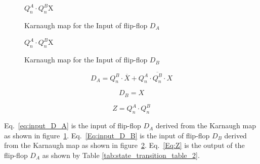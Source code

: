 


\begin{figure}[ht!]
    \centering
    \begin{Karnaughvuit}{$Q^A_n \cdot Q^B_n$}{X}
    \end{Karnaughvuit}
    \caption{Karnaugh map for the Input of flip-flop $D_A$}\label{fig:input_D_A}
\end{figure}\FloatBarrier



\begin{figure}[ht!]
\centering
\begin{Karnaughvuit}{$Q^A_n \cdot Q^B_n$}{X}
\end{Karnaughvuit}
\caption{Karnaugh map for the Input of flip-flop $D_B$}\label{fig:input_D_B}
\end{figure}\FloatBarrier

\begin{equation}\label{eq:input_D_A}
    D_A = {Q^B_n} \cdot \overline{X} + Q^A_n \cdot \overline{Q^B_n} \cdot X
\end{equation}

\begin{equation}\label{Eq:input_D_B}
    D_B = X
\end{equation}

\begin{equation}\label{Eq:Z}
    Z = Q^A_n \cdot Q^B_n
\end{equation}

Eq.~\ref{eq:input_D_A} is the input of flip-flop $D_A$ derived from the Karnaugh map as shown in figure~\ref{fig:input_D_A}. 
Eq.~\ref{Eq:input_D_B} is the input of flip-flop $D_B$ derived from the Karnaugh map as shown in figure~\ref{fig:input_D_B}.
Eq.~\ref{Eq:Z} is the output of the flip-flop $D_A$ as shown by Table \ref{tab:state_transition_table_2}.
    





